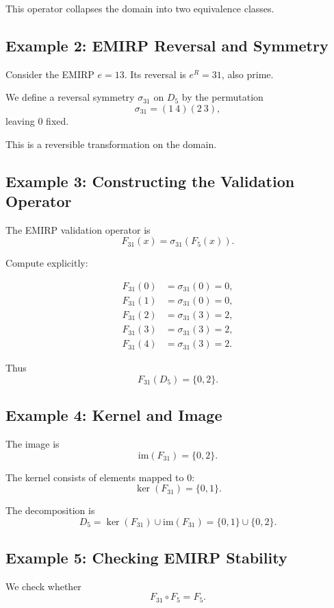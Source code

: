 \documentclass[11pt]{article}
\theoremstyle{definition}
\theoremstyle{plain}
\theoremstyle{remark}
\begin{document}
This operator collapses the domain into two equivalence classes.

\subsection{Example 2: EMIRP Reversal and Symmetry}

Consider the EMIRP $e = 13$. Its reversal is $e^R = 31$, also prime.

We define a reversal symmetry $\sigma_{31}$ on $D_5$ by the permutation
\[
\sigma_{31} = (1\ 4)(2\ 3),
\]
leaving $0$ fixed.

This is a reversible transformation on the domain.

\subsection{Example 3: Constructing the Validation Operator}

The EMIRP validation operator is
\[
F_{31}(x) = \sigma_{31}(F_5(x)).
\]

Compute explicitly:

\[
\begin{aligned}
F_{31}(0) &= \sigma_{31}(0) = 0, \\
F_{31}(1) &= \sigma_{31}(0) = 0, \\
F_{31}(2) &= \sigma_{31}(3) = 2, \\
F_{31}(3) &= \sigma_{31}(3) = 2, \\
F_{31}(4) &= \sigma_{31}(3) = 2.
\end{aligned}
\]

Thus
\[
F_{31}(D_5) = \{0,2\}.
\]

\subsection{Example 4: Kernel and Image}

The image is
\[
\mathrm{im}(F_{31}) = \{0,2\}.
\]

The kernel consists of elements mapped to $0$:
\[
\ker(F_{31}) = \{0,1\}.
\]

The decomposition is
\[
D_5 = \ker(F_{31}) \cup \mathrm{im}(F_{31})
= \{0,1\} \cup \{0,2\}.
\]

\subsection{Example 5: Checking EMIRP Stability}

We check whether
\[
F_{31} \circ F_5 = F_5.
\]
\end{document}
